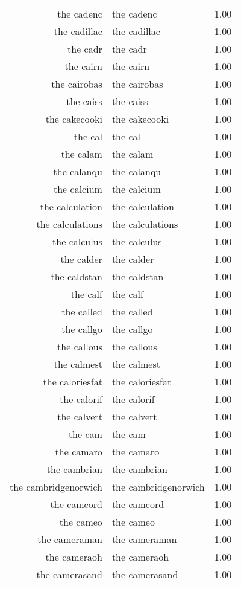 \begin{table}[ht]
\begin{tabular}{rlr}
  the cadenc & the cadenc & 1.00 \\ 
  the cadillac & the cadillac & 1.00 \\ 
  the cadr & the cadr & 1.00 \\ 
  the cairn & the cairn & 1.00 \\ 
  the cairobas & the cairobas & 1.00 \\ 
  the caiss & the caiss & 1.00 \\ 
  the cakecooki & the cakecooki & 1.00 \\ 
  the cal & the cal & 1.00 \\ 
  the calam & the calam & 1.00 \\ 
  the calanqu & the calanqu & 1.00 \\ 
  the calcium & the calcium & 1.00 \\ 
  the calculation & the calculation & 1.00 \\ 
  the calculations & the calculations & 1.00 \\ 
  the calculus & the calculus & 1.00 \\ 
  the calder & the calder & 1.00 \\ 
  the caldstan & the caldstan & 1.00 \\ 
  the calf & the calf & 1.00 \\ 
  the called & the called & 1.00 \\ 
  the callgo & the callgo & 1.00 \\ 
  the callous & the callous & 1.00 \\ 
  the calmest & the calmest & 1.00 \\ 
  the caloriesfat & the caloriesfat & 1.00 \\ 
  the calorif & the calorif & 1.00 \\ 
  the calvert & the calvert & 1.00 \\ 
  the cam & the cam & 1.00 \\ 
  the camaro & the camaro & 1.00 \\ 
  the cambrian & the cambrian & 1.00 \\ 
  the cambridgenorwich & the cambridgenorwich & 1.00 \\ 
  the camcord & the camcord & 1.00 \\ 
  the cameo & the cameo & 1.00 \\ 
  the cameraman & the cameraman & 1.00 \\ 
  the cameraoh & the cameraoh & 1.00 \\ 
  the camerasand & the camerasand & 1.00 \\ 

\end{tabular}
\end{table}
